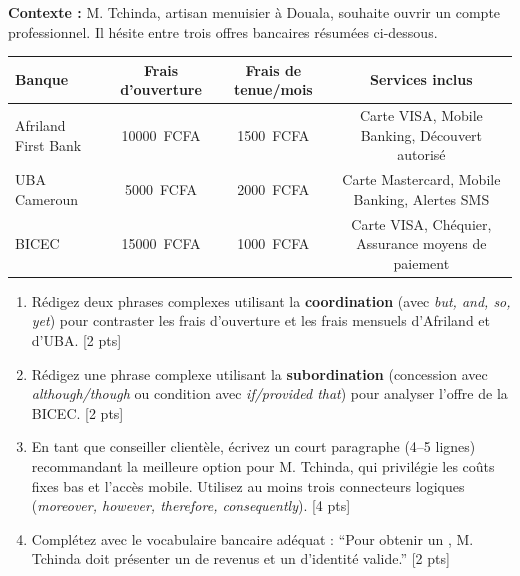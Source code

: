 \documentclass[11pt]{article}
\begin{document}
\begin{exercice}
\textbf{Contexte :} M. Tchinda, artisan menuisier à Douala, souhaite ouvrir un compte professionnel. Il hésite entre trois offres bancaires résumées ci-dessous.

\begin{tabular}{lccc}
\toprule
\textbf{Banque} & \textbf{Frais d'ouverture} & \textbf{Frais de tenue/mois} & \textbf{Services inclus} \\
\midrule
Afriland First Bank & \SI{10000}{FCFA} & \SI{1500}{FCFA} & Carte VISA, Mobile Banking, Découvert autorisé \\
UBA Cameroun & \SI{5000}{FCFA} & \SI{2000}{FCFA} & Carte Mastercard, Mobile Banking, Alertes SMS \\
BICEC & \SI{15000}{FCFA} & \SI{1000}{FCFA} & Carte VISA, Chéquier, Assurance moyens de paiement \\
\bottomrule
\end{tabular}

\begin{enumerate}
    \item Rédigez deux phrases complexes utilisant la \textbf{coordination} (avec \textit{but, and, so, yet}) pour contraster les frais d'ouverture et les frais mensuels d'Afriland et d'UBA. [2 pts]
    \item Rédigez une phrase complexe utilisant la \textbf{subordination} (concession avec \textit{although/though} ou condition avec \textit{if/provided that}) pour analyser l'offre de la BICEC. [2 pts]
    \item En tant que conseiller clientèle, écrivez un court paragraphe (4--5 lignes) recommandant la meilleure option pour M. Tchinda, qui privilégie les coûts fixes bas et l'accès mobile. Utilisez au moins trois connecteurs logiques (\textit{moreover, however, therefore, consequently}). [4 pts]
    \item Complétez avec le vocabulaire bancaire adéquat : ``Pour obtenir un \underline{\hspace{2.5cm}}, M. Tchinda doit présenter un \underline{\hspace{2.5cm}} de revenus et un \underline{\hspace{2.5cm}} d'identité valide.'' [2 pts]
\end{enumerate}
\end{exercice}
\end{document}
